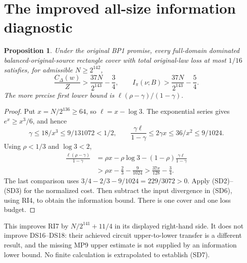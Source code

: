 \documentclass[11pt]{article}
\newtheorem{proposition}{Proposition}
\begin{document}
\section{The improved all-size information diagnostic}
\begin{proposition}
Under the original BP1 promise, every full-domain dominated
balanced-original-source rectangle cover with total original-law
loss at most $1/16$ satisfies, for admissible $N\ge2^{142}$,
\[
 \frac{C_\Delta(w)}Z>\frac{37N}{2^{143}}-\frac34,
 \qquad
 I_\pi(\nu;B)>\frac{37N}{2^{143}}-\frac54.             \tag{SD7}
\]
The more precise first lower bound is
$\ell(\rho-\gamma)/(1-\gamma)$.
\end{proposition}
\begin{proof}
Put $x=N/2^{136}\ge64$, so $\ell=x-\log3$.
The exponential series gives $e^x\ge x^3/6$, and hence
\[
 \gamma\le18/x^3\le9/131072<1/2,\qquad
 \frac{\gamma\ell}{1-\gamma}
       \le2\gamma x\le36/x^2\le9/1024.
\]
Using $\rho<1/3$ and $\log3<2$,
\[
 \begin{split}
 \frac{\ell(\rho-\gamma)}{1-\gamma}
 &=\rho x-\rho\log3
                -(1-\rho)\frac{\gamma\ell}{1-\gamma}\\
 &>\rho x-\frac23-\frac9{1024}
 >\frac{37x}{128}-\frac34 .
 \end{split}
\]
The last comparison uses
$3/4-2/3-9/1024=229/3072>0$.
Apply (SD2)--(SD3) for the normalized cost.
Then subtract the input divergence in (SD6), using RI4, to obtain
the information bound. There is one cover and one loss budget.
\end{proof}

This improves RI7 by $N/2^{141}+11/4$ in its displayed right-hand
side. It does not improve DS16--DS18: their achieved circuit
upper-to-lower transfer is a different result, and the missing
MP9 upper estimate is not supplied by an information lower bound.
No finite calculation is extrapolated to establish (SD7).
\end{document}
